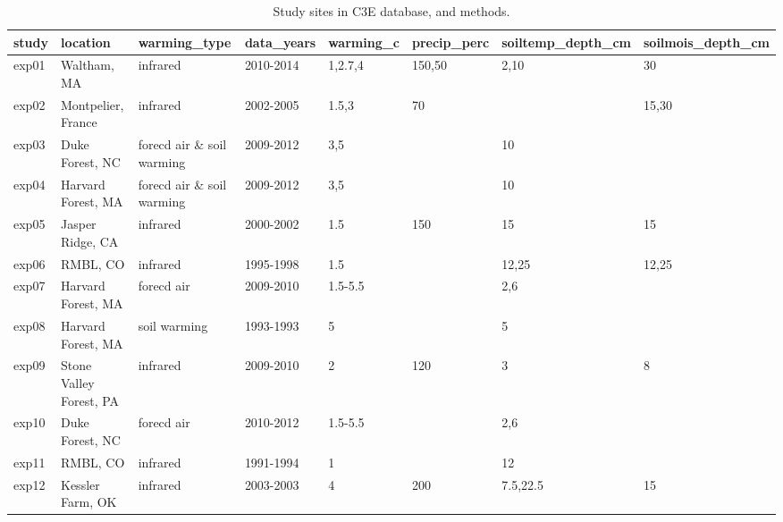 \documentclass{article}
\begin{document}
\begin{landscape}

\begin{table}[ht]
\centering
\caption{Study sites in C3E database, and methods.} 
\label{table:sites}
\begin{tabular}{llllllll}
  \hline
study & location & warming\_type & data\_years & warming\_c & precip\_perc & soiltemp\_depth\_cm & soilmois\_depth\_cm \\ 
  \hline
exp01 & Waltham, MA & infrared & 2010-2014 & 1,2.7,4 & 150,50 & 2,10 & 30 \\ 
  exp02 & Montpelier, France & infrared & 2002-2005 & 1.5,3 & 70 &   & 15,30 \\ 
  exp03 & Duke Forest, NC & forecd air \& soil warming & 2009-2012 & 3,5 &   & 10 &   \\ 
  exp04 & Harvard Forest, MA & forecd air \& soil warming & 2009-2012 & 3,5 &   & 10 &   \\ 
  exp05 & Jasper Ridge, CA & infrared & 2000-2002 & 1.5 & 150 & 15 & 15 \\ 
  exp06 & RMBL, CO & infrared & 1995-1998 & 1.5 &   & 12,25 & 12,25 \\ 
  exp07 & Harvard Forest, MA & forecd air & 2009-2010 & 1.5-5.5 &   & 2,6 &   \\ 
  exp08 & Harvard Forest, MA & soil warming & 1993-1993 & 5 &   & 5 &   \\ 
  exp09 & Stone Valley Forest, PA & infrared & 2009-2010 & 2 & 120 & 3 & 8 \\ 
  exp10 & Duke Forest, NC & forecd air & 2010-2012 & 1.5-5.5 &   & 2,6 &   \\ 
  exp11 & RMBL, CO & infrared & 1991-1994 & 1 &   & 12 &   \\ 
  exp12 & Kessler Farm, OK & infrared & 2003-2003 & 4 & 200 & 7.5,22.5 & 15 \\ 
   \hline
\end{tabular}
\end{table}
\end{landscape}
\clearpage



\end{document}
